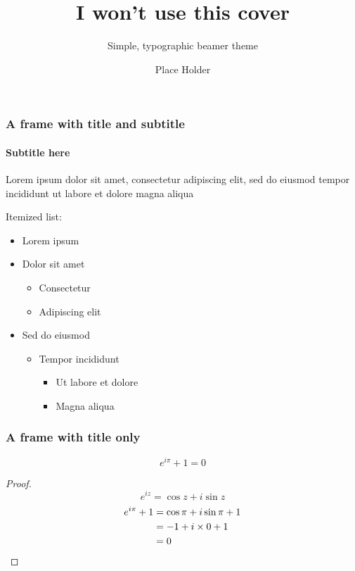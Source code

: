 \documentclass[aspectratio=169,compress,12pt]{beamer}
\title{I won't use this cover}
\subtitle{Simple, typographic beamer theme}
\date{}
\author{Place Holder}
\institute{University of \TeX}
\begin{document}
\frame[plain]{\titlepage}


\begin{frame}
      \frametitle{A frame with title and subtitle}
      \framesubtitle{Subtitle here}
      Lorem ipsum dolor sit amet, consectetur adipiscing elit, sed do eiusmod tempor incididunt ut labore et dolore magna aliqua \par
      Itemized list:
      \begin{itemize}
            \item Lorem ipsum
            \item Dolor sit amet
                  \begin{itemize}
                        \item Consectetur
                        \item Adipiscing elit
                  \end{itemize}
            \item Sed do eiusmod
                  \begin{itemize}
                        \item Tempor incididunt
                              \begin{itemize}
                                    \item Ut labore et dolore
                                    \item Magna aliqua
                              \end{itemize}
                  \end{itemize}
      \end{itemize}
\end{frame}

\begin{frame}
      \frametitle{A frame with title only}
      \begin{theorem}
            \[e^{i\pi}+1=0\]
            \begin{proof}
                  \begin{equation*}
                        e^{iz}=\cos{z}+i\sin{z}
                  \end{equation*}
                  \begin{align*}
                        e^{i\pi}+1 & \null=\cos\pi+i\sin\pi+1 \\
                                   & \null=-1+i\times0+1      \\
                                   & \null=0
                  \end{align*}
            \end{proof}
      \end{theorem}
\end{frame}
\end{document}
